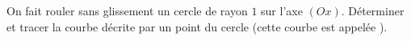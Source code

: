\begin{exercice}[\coolexo]\label{exoCourbesSurfaces0003}

	On fait rouler sans glissement un cercle de rayon $1$ sur l'axe $ (Ox)$.  Déterminer et tracer la courbe décrite par un point du cercle (cette courbe est appelée ).

\end{exercice}
